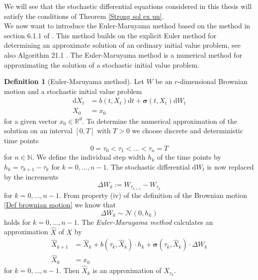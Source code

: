 \documentclass[11pt,titlepage]{article}
\newcommand{\R}{\mathbb{R}} %
\newcommand{\N}{\mathbb{N}} %
\theoremstyle{definition}
\newtheorem{definition}[theorem]{Definition}
\theoremstyle{remark}
\begin{document}
	We will see that the stochastic differential equations considered in this thesis will
	satisfy the conditions of Theorem \ref{Strong sol ex un}. \\
	We now want to introduce the Euler-Maruyama method based on the method in section 6.1.1 of \cite{Glasserman2004}. This method builds on the explicit Euler method for determining an approximate solution of an ordinary initial value problem, see also Algorithm 21.1 \cite{Bartels2016}. The Euler-Maruyama method is a numerical method for approximating the solution of a stochastic initial value problem.
	
	\begin{definition}[Euler-Maruyama method]\label{Def Euler-Maruyama method} \label{Def Eul Mar method}
		Let $W$ be an $r$-dimensional Brownian motion and a stochastic initial value problem
		\begin{align*}
			\mathrm{d}X_t &= b(t, X_t)\mathrm{d}t + \boldsymbol{\sigma}(t, X_t)\mathrm{d}W_t \\
			X_0 &= x_0
		\end{align*}
		for a given vector $x_0\in\R^d$. To determine the numerical approximation of the solution on an interval 
		$[0,T]$ with $T>0$ we choose discrete and deterministic time points 
		\[0= \tau_0< \tau_1<\ldots< \tau_n =T\]
		for $n\in\N$. We define the individual step width $h_k$ of the time points by 
		$h_k = \tau_{k+1}-\tau_k$ for $k=0,\ldots,n-1$. The stochastic differential $\mathrm{d}W_t$ 
		is now replaced by the increments
		\[\Delta W_k := W_{\tau_{k+1}}-W_{\tau_k}\]
		for $k=0,\ldots,n-1$. From property (iv) of the definition of the Brownian motion \ref{Def brownian motion} we know that
		\[\Delta W_k \sim \mathcal{N}(0, h_k)\]
		holds for $k=0,\ldots, n-1$. The \textsl{Euler-Maruyama method} calculates an approximation $\hat{X}$ of $X$ by
		\begin{align*}
			\hat{X}_{k+1} &= \hat{X}_k + b(\tau_k, \hat{X}_k)\cdot h_k + \boldsymbol{\sigma}(\tau_k, \hat{X}_k)\cdot \Delta W_k\\
			\hat{X}_0 &= x_0
		\end{align*}
		for $k=0,\ldots,n-1$. Then $\hat{X}_k$ is an approximation of $X_{\tau_k}$.
		
	\end{definition}
	
\end{document}
